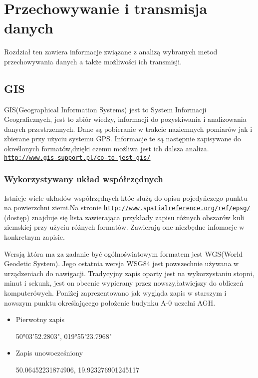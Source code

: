 \section{Przechowywanie i transmisja danych}
\label{sec:przesyl}

Rozdział ten zawiera informacje związane z analizą wybranych metod przechowywania danych a także możliwości ich transmisji.

\subsection{GIS}
\label{subsec:gis}

GIS(Geographical Information Systems) jest to System Informacji Geograficznych, jest to zbiór wiedzy, informacji do pozyskiwania i analizowania danych przestrzennych. Dane są pobieranie w trakcie naziemnych pomiarów jak i zbierane przy użyciu systemu GPS. Informacje te są następnie zapisywane do określonych formatów,dzięki czemu możliwa jest ich dalsza analiza. \underline{\texttt{http://www.gis-support.pl/co-to-jest-gis/}}


\subsubsection{Wykorzystywany układ współrzędnych}
\label{subsec:uklad}

Istnieje wiele układów współrzędnych któe służą do opisu pojedyńczego punktu na powierzchni ziemi.Na stronie \underline{\texttt{http://www.spatialreference.org/ref/epsg/}} (dostęp) znajduje się lista zawierająca przykłady zapisu różnych obszarów kuli ziemskiej przy użyciu różnych formatów. Zawierają one niezbędne infomacje w konkretnym zapisie.

Wersją która ma za zadanie być ogólnoświatowym formatem jest WGS(World Geodetic System). Jego ostatnia wersja  WSG84 jest powszechnie używana w urządzeniach do nawigacji.
Tradycyjny zapis oparty jest na wykorzystaniu stopni, minut i sekunk, jest on obecnie wypierany przez nowszy,łatwiejszy do obliczeń komputerówych. Poniżej zaprezentowano jak wygląda zapis w starszym i nowszym punktu określającego położenie budynku A-0 uczelni AGH.

\begin{itemize}

\item
Pierwotny zapis

50°03'52.2803", 019°55'23.7968"
\item
Zapis unowocześniony

50.06452231874906, 19.923276901245117
\end{itemize}

